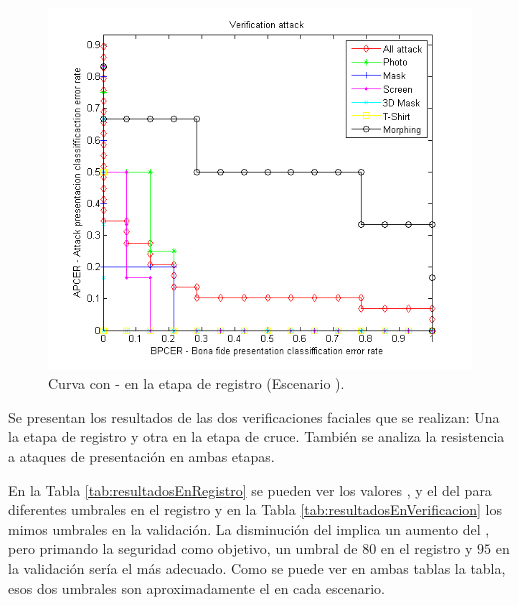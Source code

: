\begin{figure}
\centering
    \includegraphics[width=1\textwidth]{ch-sistemasABC/images/ch-evaluacion_topologias/APCER_BPCER_CURVE_IN_THE_VERIFICACION.png}
    \caption{Curva  con - en la etapa de registro (Escenario ).}
    \label{fig:APCERBPCERVerificacion}
\end{figure}

\color{blue}Se presentan los resultados de las dos verificaciones faciales que se realizan: Una la etapa de registro y otra en la etapa de cruce. También se analiza la resistencia a ataques de presentación en ambas etapas.\color{black}

En la Tabla \ref{tab:resultadosEnRegistro} se pueden ver los valores ,  y el  del  para diferentes umbrales en el registro y en la Tabla \ref{tab:resultadosEnVerificacion} los mimos umbrales en la validación. La disminución del  implica un aumento del , pero primando la seguridad como objetivo, un umbral de $80$ en el registro y $95$ en la validación sería el más adecuado. Como se puede ver en ambas tablas la tabla, esos dos umbrales son aproximadamente el  en cada escenario.

